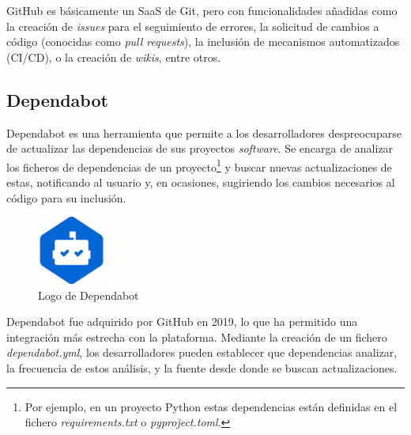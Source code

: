 GitHub es básicamente un SaaS de Git, pero con funcionalidades añadidas como la creación de \emph{issues} para el seguimiento de errores, la solicitud de cambios a código (conocidas como \emph{pull requests}), la inclusión de mecanismos automatizados (CI/CD), o la creación de \emph{wikis}, entre otros. \emph{\parencite{Reference22}}

\subsection{Dependabot}\label{sec:dependabot}

Dependabot es una herramienta que permite a los desarrolladores despreocuparse de actualizar las dependencias de sus proyectos \emph{software}. Se encarga de analizar los ficheros de dependencias de un proyecto\footnote{Por ejemplo, en un proyecto Python estas dependencias están definidas en el fichero \emph{requirements.txt} o \emph{pyproject.toml}.} y buscar nuevas actualizaciones de estas, notificando al usuario y, en ocasiones, sugiriendo los cambios necesarios al código para su inclusión. \emph{\parencite{Reference24}}

\begin{figure}[ht]
    \centering
    \includegraphics[width=0.2\textwidth]{Figures/dependabot-logo}
    \decoRule
    \caption[Dependabot (Logo)]{Logo de Dependabot \emph{\parencite{Reference25}}}
    \label{fig:dependabot-logo}
\end{figure}

Dependabot fue adquirido por GitHub en 2019, lo que ha permitido una integración más estrecha con la plataforma. Mediante la creación de un fichero \emph{dependabot.yml}, los desarrolladores pueden establecer que dependencias analizar, la frecuencia de estos análisis, y la fuente desde donde se buscan actualizaciones. \emph{\parencite{Reference24}}
